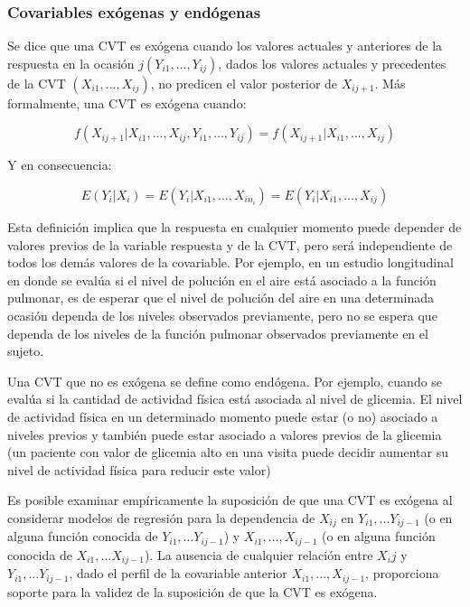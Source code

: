 \documentclass[spanish]{article}
\numberwithin{figure}{subsection}
\numberwithin{equation}{subsection}
\numberwithin{table}{subsection}
\begin{document}
\subsubsection{Covariables exógenas y endógenas}

Se dice que una CVT es exógena cuando los valores actuales y anteriores de la
respuesta en la ocasión $j (Y_{i1}, ..., Y_{ij})$, dados los valores actuales y
precedentes de la CVT $(X_{i1}, ..., X_{ij})$, no predicen el valor posterior
de $X_{ij+1}$. Más formalmente, una CVT es exógena cuando:

\begin{equation}
	\label{exogeneidad}
	f(X_{ij+1}|X_{i1}, ..., X_{ij}, Y_{i1}, ..., Y_{ij}) =
	f(X_{ij+1}|X_{i1}, ..., X_{ij})
\end{equation}

Y en consecuencia:

\begin{equation}
	\label{exogeneidad debil}
	E(Y_i|X_i) = E(Y_i|X_{i1}, ..., X_{in_i}) = E(Y_i|X_{i1}, ..., X_{ij})
\end{equation}

Esta definición implica que la respuesta en cualquier momento puede depender de
valores previos de la variable respuesta y de la CVT, pero será independiente
de todos los demás valores de la covariable. Por ejemplo, en un estudio
longitudinal en donde se evalúa si el nivel de polución en el aire está
asociado a la función pulmonar, es de esperar que el nivel de polución del aire
en una determinada ocasión dependa de los niveles observados previamente, pero
no se espera que dependa de los niveles de la función pulmonar observados
previamente en el sujeto.

Una CVT que no es exógena se define como endógena. Por ejemplo, cuando se
evalúa si la cantidad de actividad física está asociada al nivel de glicemia.
El nivel de actividad física en un determinado momento puede estar (o no)
asociado a niveles previos y también puede estar asociado a valores previos de
la glicemia (un paciente con valor de glicemia alto en una visita puede decidir
aumentar su nivel de actividad física para reducir este valor)

Es posible examinar empíricamente la suposición de que una CVT es exógena al
considerar modelos de regresión para la dependencia de $X_{ij}$ en
$Y_{i1}, ... Y_{ij-1}$ (o en alguna función conocida de
$Y_{i1}, ... Y_{ij-1}$) y $X_{i1}, ..., X_{ij-1}$ (o en alguna función conocida
de $X_{i1}, ... X_{ij-1}$). La ausencia de cualquier relación entre $X_ij$ y
$Y_{i1}, ... Y_{ij-1}$, dado el perfil de la covariable anterior
$X_{i1}, ..., X_{ij-1}$, proporciona soporte para la validez de la suposición
de que la CVT es exógena.
\end{document}
